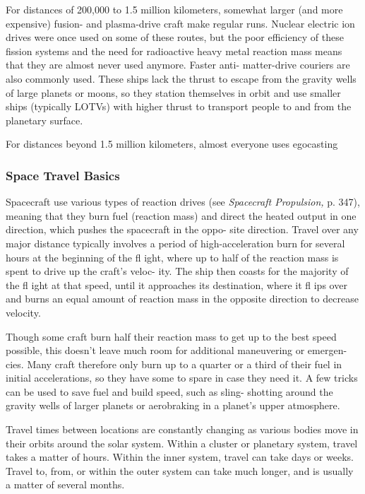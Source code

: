 For distances of 200,000 to 1.5 million kilometers, 
somewhat larger (and more expensive) fusion- and 
plasma-drive craft make regular runs. Nuclear electric 
ion drives were once used on some of these routes, 
but the poor efficiency of these fission systems and the 
need for radioactive heavy metal reaction mass means 
that they are almost never used anymore. Faster anti-
matter-drive couriers are also commonly used. These 
ships lack the thrust to escape from the gravity wells 
of large planets or moons, so they station themselves 
in orbit and use smaller ships (typically LOTVs) with 
higher thrust to transport people to and from the 
planetary surface.

For distances beyond 1.5 million kilometers, almost 
everyone uses egocasting

\subsubsection{Space Travel Basics}

Spacecraft use various types of reaction drives (see 
\textit{Spacecraft Propulsion,} p. 347), meaning that they burn 
fuel (reaction mass) and direct the heated output in 
one direction, which pushes the spacecraft in the oppo-
site direction. Travel over any major distance typically 
involves a period of high-acceleration burn for several 
hours at the beginning of the fl ight, where up to half of 
the reaction mass is spent to drive up the craft's veloc-
ity. The ship then coasts for the majority of the fl ight at 
that speed, until it approaches its destination, where it 
fl ips over and burns an equal amount of reaction mass 
in the opposite direction to decrease velocity.

Though some craft burn half their reaction mass 
to get up to the best speed possible, this doesn't leave 
much room for additional maneuvering or emergen-
cies. Many craft therefore only burn up to a quarter 
or a third of their fuel in initial accelerations, so they 
have some to spare in case they need it. A few tricks 
can be used to save fuel and build speed, such as sling-
shotting around the gravity wells of larger planets or 
aerobraking in a planet's upper atmosphere.

Travel times between locations are constantly 
changing as various bodies move in their orbits 
around the solar system. Within a cluster or planetary 
system, travel takes a matter of hours. Within the 
inner system, travel can take days or weeks. Travel to, 
from, or within the outer system can take much longer, 
and is usually a matter of several months.

